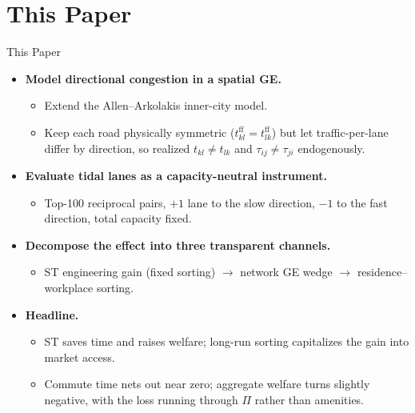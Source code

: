 \documentclass[11pt,aspectratio=169]{beamer}
\newcommand{\good}[1]{\textcolor{blue!70!black}{#1}}
\newcommand{\bad}[1]{\textcolor{red!70!black}{#1}}
\begin{document}
\section{This Paper}
\begin{frame}{This Paper}
\begin{itemize}
  \item \textbf{Model directional congestion in a spatial GE.}
  \begin{itemize}\footnotesize
    \item Extend the Allen--Arkolakis inner-city model.
    \item Keep each road \good{physically symmetric} ($t_{kl}^{\mathrm{ff}}=t_{lk}^{\mathrm{ff}}$) but let \good{traffic-per-lane} differ by direction, so realized $t_{kl}\neq t_{lk}$ and $\tau_{ij}\neq\tau_{ji}$ endogenously.
  \end{itemize}
  \item \textbf{Evaluate tidal lanes as a capacity-neutral instrument.}
  \begin{itemize}\footnotesize
    \item Top-100 reciprocal pairs, $+1$ lane to the slow direction, $-1$ to the fast direction, total capacity fixed.
  \end{itemize}
  \item \textbf{Decompose the effect into three transparent channels.}
  \begin{itemize}\footnotesize
    \item \good{ST engineering gain} (fixed sorting) $\to$ \good{network GE wedge} $\to$ \bad{residence--workplace sorting}.
  \end{itemize}
  \item \textbf{Headline.}
  \begin{itemize}\footnotesize
    \item ST \good{saves time and raises welfare}; long-run \bad{sorting capitalizes the gain into market access}.
    \item Commute time nets out near zero; aggregate welfare turns slightly negative, with the loss running through $\Pi$ rather than amenities.
  \end{itemize}
\end{itemize}
\end{frame}

\end{document}
